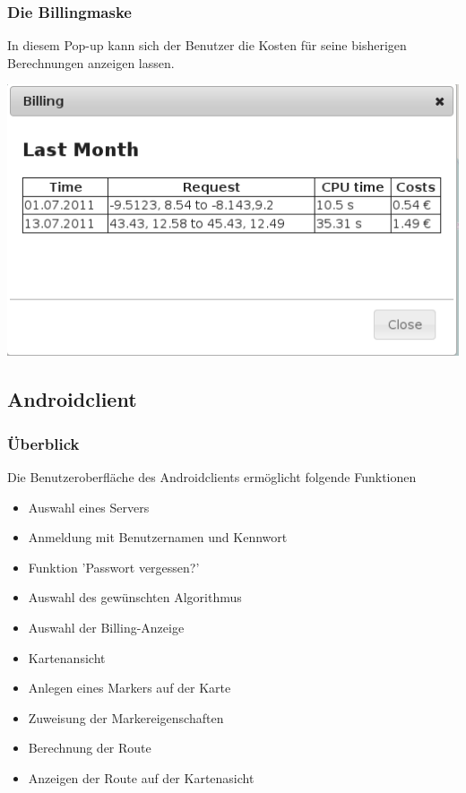 \documentclass[a4paper,10pt,titlepage]{article}
\begin{document}
\subsubsection{Die Billingmaske}
In diesem Pop-up kann sich der Benutzer die Kosten für seine bisherigen Berechnungen anzeigen lassen.
\begin {center}
\includegraphics[scale=0.5]{media/web/Billing.png}
\end {center}

\newpage
\subsection{Androidclient}

\subsubsection{Überblick}
Die Benutzeroberfläche des Androidclients ermöglicht folgende Funktionen
\begin{itemize}
\item Auswahl eines Servers
\item Anmeldung mit Benutzernamen und Kennwort
\item Funktion 'Passwort vergessen?'
\item Auswahl des gewünschten Algorithmus
\item Auswahl der Billing-Anzeige 
\item Kartenansicht
\item Anlegen eines Markers auf der Karte
\item Zuweisung der Markereigenschaften
\item Berechnung der Route
\item Anzeigen der Route auf der Kartenasicht
\end{itemize}
\end{document}
